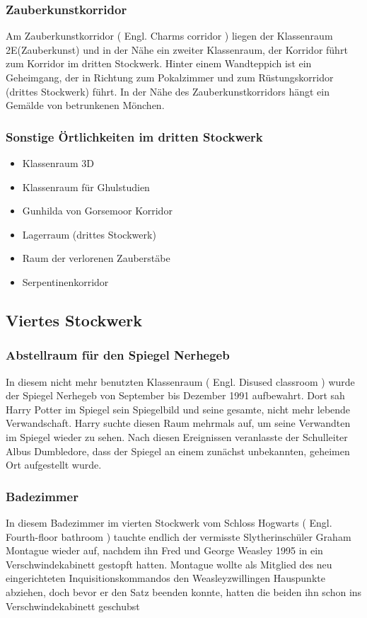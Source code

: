 \documentclass[a4paper, 10pt]{article}
\begin{document}
\subsubsection*{\large Zauberkunstkorridor}
Am Zauberkunstkorridor (  Engl.  Charms corridor ) liegen der Klassenraum 2E(Zauberkunst) und in der Nähe ein zweiter Klassenraum, der Korridor führt zum Korridor im dritten Stockwerk. Hinter einem Wandteppich ist ein Geheimgang, der in Richtung zum Pokalzimmer und zum Rüstungskorridor (drittes Stockwerk) führt. In der Nähe des Zauberkunstkorridors hängt ein Gemälde von betrunkenen Mönchen.

\subsubsection*{\large Sonstige Örtlichkeiten im dritten Stockwerk}
\vspace{10pt}
\begin{itemize}
    \item Klassenraum 3D
    \item Klassenraum für Ghulstudien
    \item Gunhilda von Gorsemoor Korridor
    \item Lagerraum (drittes Stockwerk)
    \item Raum der verlorenen Zauberstäbe
    \item Serpentinenkorridor
\end{itemize}

\subsection*{\Large Viertes Stockwerk}

\subsubsection*{\large Abstellraum für den Spiegel Nerhegeb}
In diesem nicht mehr benutzten Klassenraum (  Engl.  Disused classroom ) wurde der Spiegel Nerhegeb von September bis Dezember 1991 aufbewahrt. Dort sah Harry Potter im Spiegel sein Spiegelbild und seine gesamte, nicht mehr lebende Verwandschaft. Harry suchte diesen Raum mehrmals auf, um seine Verwandten im Spiegel wieder zu sehen. Nach diesen Ereignissen veranlasste der Schulleiter Albus Dumbledore, dass der Spiegel an einem zunächst unbekannten, geheimen Ort aufgestellt wurde.
\subsubsection*{\large Badezimmer}
In diesem Badezimmer im vierten Stockwerk vom Schloss Hogwarts (  Engl.  Fourth-floor bathroom ) tauchte endlich der vermisste Slytherinschüler Graham Montague wieder auf, nachdem ihn Fred und George Weasley 1995 in ein Verschwindekabinett gestopft hatten. Montague wollte als Mitglied des neu eingerichteten Inquisitionskommandos den Weasleyzwillingen Hauspunkte abziehen, doch bevor er den Satz beenden konnte, hatten die beiden ihn schon ins Verschwindekabinett geschubst
\end{document}
